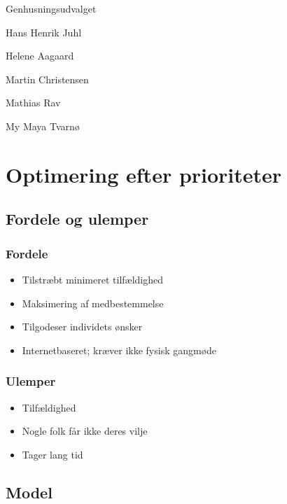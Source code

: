 \documentclass[article,oneside,11pt]{memoir}
\begin{document}
\begin{centering}
{\LARGE Genhusningsudvalget}

\vspace{1em} {\large
Hans Henrik Juhl

Helene Aagaard

Martin Christensen

Mathias Rav

My Maya Tvarnø

}
\end{centering}

\chapter{Optimering efter prioriteter}

\section{Fordele og ulemper}
\begin{minipage}[t]{0.45\linewidth}
\small
\subsection{Fordele}
\begin{itemize}[leftmargin=0ex]
\item[] Tilstræbt minimeret tilfældighed
\item[] Maksimering af medbestemmelse
\item[] Tilgodeser individets ønsker
\item[] Internetbaseret; kræver ikke fysisk gangmøde
\end{itemize}
\end{minipage}
\hspace{0.1\linewidth}
\begin{minipage}[t]{0.45\linewidth}
\small
\subsection{Ulemper}
\begin{itemize}[leftmargin=0ex]
\item[] Tilfældighed
\item[] Nogle folk får ikke deres vilje
\item[] Tager lang tid
\end{itemize}
\end{minipage}

\section{Model}
\end{document}

